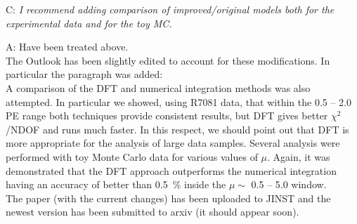 \documentclass[a4paper,11pt]{article}
\begin{document}
C: \emph{I recommend adding comparison of improved/original models both for the experimental data and for the toy MC.}

A: Have been treated above.
\\[1ex]

The Outlook has been slightly edited to account for these modifications. 
In particular the paragraph was added:
\\[1ex]

A comparison of the DFT and numerical integration methods was also attempted. 
In particular we showed, using R7081 data, that within the 0.5 -- 2.0 PE range both techniques provide consistent results, but DFT gives better $\chi^2$/NDOF and runs much faster. 
In this respect, we should point out that DFT is more appropriate for the analysis of large data samples. 
Several analysis were performed with toy Monte Carlo data for various values of $\mu$. 
Again, it was demonstrated that the DFT approach outperforms the numerical integration having an accuracy of better than 0.5~\% inside the $\mu\sim $ 0.5 -- 5.0 window. 
\\[1ex]

The paper (with the current changes) has been uploaded to JINST and the newest version has been submitted to arxiv (it should appear soon).
\end{document}
